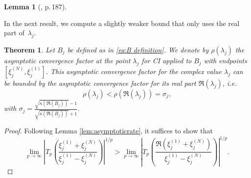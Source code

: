 \documentclass{article}
\newtheorem{lem}{Lemma}
\newtheorem{thm}{Theorem}
\theoremstyle{definition}
\begin{document}
{\begin{lem}[\cite{axelsson1996iterative}, p.\,187]
		\end{lem}
		
		In the next result, we compute a slightly weaker bound that only uses the real part of~$\lambda_j$. 
		
		\begin{thm}\label{thm:convergence}
			Let $B_j$ be defined as in \eqref{eq:B definition}. We denote by  $\rho(\lambda_j)$ the
			{asymptotic convergence factor at the point $\lambda_j$ for  CI} applied to $B_j$ with endpoints $ [\xi_{j}^{(N)},\xi_{j}^{(1)}]$. This {asymptotic convergence factor for the complex value $\lambda_j$} can be bounded by the {asymptotic convergence factor for its real part $\Re(\lambda_j)$}, i.e. 
			\begin{equation}\label{eq:real rate of conv}
				\rho(\lambda_j) < \rho(\Re(\lambda_j)) = {\sigma_j},
			\end{equation}
			{with $\sigma_j = \frac{\sqrt{\kappa(\Re(B_j))}-1}{\sqrt{\kappa(\Re(B_j))}+1}$}.
		\end{thm}
		\begin{proof}
			Following Lemma \ref{lem:asymptoticrate}, it suffices to show that
			$$
			\lim_{p\rightarrow \infty} \left|T_p \left(\frac{\xi_j^{(1)}+\xi_j^{(N)}}{\xi_j^{(1)}-\xi_j^{(N)}}\right)\right|^{1/p}  > \lim_{p\rightarrow \infty} \left|T_p \left(\frac{\Re(\xi_j^{(1)}+\xi_j^{(N)})}{\xi_j^{(1)}-\xi_j^{(N)}}\right)\right|^{1/p}.
			$$
			

\end{proof}}
\end{document}
